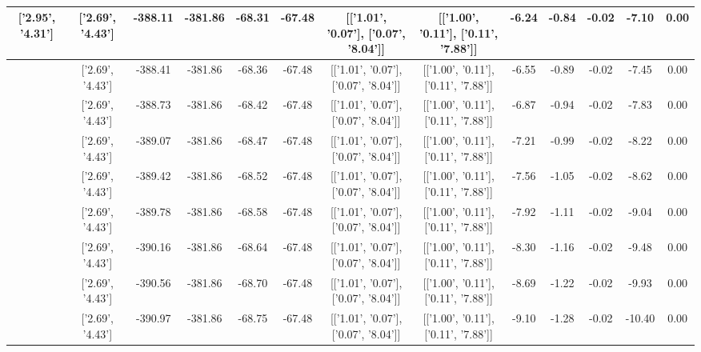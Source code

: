 \begin{table}[htbp]
\begin{adjustbox}{angle=90}
\begin{tabular}{|c|c|c|c|c|c|c|c|c|c|c|c|c|}
 ['2.95', '4.31'] & ['2.69', '4.43'] & -388.11 & -381.86 & -68.31 & -67.48 & [['1.01', '0.07'], ['0.07', '8.04']] & [['1.00', '0.11'], ['0.11', '7.88']] & -6.24 & -0.84 & -0.02 & -7.10 & 0.00\\ \hline
 ['2.96', '4.30'] & ['2.69', '4.43'] & -388.41 & -381.86 & -68.36 & -67.48 & [['1.01', '0.07'], ['0.07', '8.04']] & [['1.00', '0.11'], ['0.11', '7.88']] & -6.55 & -0.89 & -0.02 & -7.45 & 0.00\\ \hline
 ['2.97', '4.29'] & ['2.69', '4.43'] & -388.73 & -381.86 & -68.42 & -67.48 & [['1.01', '0.07'], ['0.07', '8.04']] & [['1.00', '0.11'], ['0.11', '7.88']] & -6.87 & -0.94 & -0.02 & -7.83 & 0.00\\ \hline
 ['2.98', '4.29'] & ['2.69', '4.43'] & -389.07 & -381.86 & -68.47 & -67.48 & [['1.01', '0.07'], ['0.07', '8.04']] & [['1.00', '0.11'], ['0.11', '7.88']] & -7.21 & -0.99 & -0.02 & -8.22 & 0.00\\ \hline
 ['3.00', '4.28'] & ['2.69', '4.43'] & -389.42 & -381.86 & -68.52 & -67.48 & [['1.01', '0.07'], ['0.07', '8.04']] & [['1.00', '0.11'], ['0.11', '7.88']] & -7.56 & -1.05 & -0.02 & -8.62 & 0.00\\ \hline
 ['3.01', '4.28'] & ['2.69', '4.43'] & -389.78 & -381.86 & -68.58 & -67.48 & [['1.01', '0.07'], ['0.07', '8.04']] & [['1.00', '0.11'], ['0.11', '7.88']] & -7.92 & -1.11 & -0.02 & -9.04 & 0.00\\ \hline
 ['3.02', '4.27'] & ['2.69', '4.43'] & -390.16 & -381.86 & -68.64 & -67.48 & [['1.01', '0.07'], ['0.07', '8.04']] & [['1.00', '0.11'], ['0.11', '7.88']] & -8.30 & -1.16 & -0.02 & -9.48 & 0.00\\ \hline
 ['3.03', '4.26'] & ['2.69', '4.43'] & -390.56 & -381.86 & -68.70 & -67.48 & [['1.01', '0.07'], ['0.07', '8.04']] & [['1.00', '0.11'], ['0.11', '7.88']] & -8.69 & -1.22 & -0.02 & -9.93 & 0.00\\ \hline
 ['3.05', '4.26'] & ['2.69', '4.43'] & -390.97 & -381.86 & -68.75 & -67.48 & [['1.01', '0.07'], ['0.07', '8.04']] & [['1.00', '0.11'], ['0.11', '7.88']] & -9.10 & -1.28 & -0.02 & -10.40 & 0.00\\ \hline
            \end{tabular}
        \end{adjustbox}
        \caption{}
        \label{}
    \end{table}
    